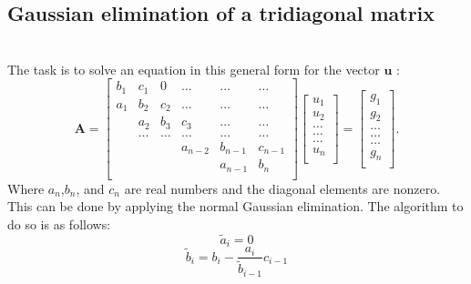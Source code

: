 \documentclass[10pt,a4paper]{article}
\begin{document}
\subsection{Gaussian elimination of a tridiagonal matrix} \\
The task is to solve an equation in this general form for the vector $\mathbf{u}$ :
\[
    \mathbf{A} = \begin{bmatrix}
                           b_1& c_1 & 0 &\dots   & \dots &\dots \\
                           a_1 & b_2 & c_2 &\dots &\dots &\dots \\
                           & a_2 & b_3 & c_3 & \dots & \dots \\
                           & \dots   & \dots &\dots   &\dots & \dots \\
                           &   &  &a_{n-2}  &b_{n-1}& c_{n-1} \\
                           &    &  &   &a_{n-1} & b_n \\
                      \end{bmatrix}\begin{bmatrix}
                           u_1\\
                           u_2\\
                           \dots \\
                          \dots  \\
                          \dots \\
                           u_n\\
                      \end{bmatrix}
  =\begin{bmatrix}
                           {g}_1\\
                           {g}_2\\
                           \dots \\
                           \dots \\
                          \dots \\
                           {g}_n\\
                      \end{bmatrix}.
\]
Where $a_n$,$b_n$, and $c_n$ are real numbers and the diagonal elements are nonzero.\\
This can be done by applying the normal Gaussian elimination. The algorithm to do so is as follows:
$$\tilde{a}_i = 0$$
$$\tilde{b}_i=b_i-\frac{a_i}{\tilde{b}_{i-1}} c_{i-1}$$
\end{document}
